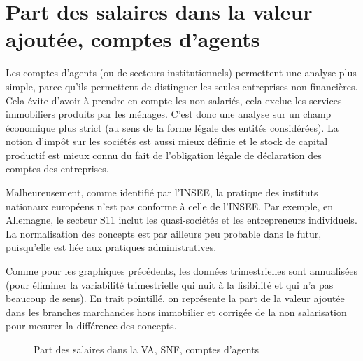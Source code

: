 \documentclass[
  french,
  9pt,
  a4paper,
]{article}
\begin{document}
\section{Part des salaires dans la valeur ajoutée, comptes
d'agents}\label{part-des-salaires-dans-la-valeur-ajoutuxe9e-comptes-dagents}

Les comptes d'agents (ou de secteurs institutionnels) permettent une
analyse plus simple, parce qu'ils permettent de distinguer les seules
entreprises non financières. Cela évite d'avoir à prendre en compte les
non salariés, cela exclue les services immobiliers produits par les
ménages. C'est donc une analyse sur un champ économique plus strict (au
sens de la forme légale des entités considérées). La notion d'impôt sur
les sociétés est aussi mieux définie et le stock de capital productif
est mieux connu du fait de l'obligation légale de déclaration des
comptes des entreprises.

Malheureusement, comme identifié par l'INSEE, la pratique des instituts
nationaux européens n'est pas conforme à celle de l'INSEE. Par exemple,
en Allemagne, le secteur S11 inclut les quasi-sociétés et les
entrepreneurs individuels. La normalisation des concepts est par
ailleurs peu probable dans le futur, puisqu'elle est liée aux pratiques
administratives.

Comme pour les graphiques précédents, les données trimestrielles sont
annualisées (pour éliminer la variabilité trimestrielle qui nuit à la
lisibilité et qui n'a pas beaucoup de sens). En trait pointillé, on
représente la part de la valeur ajoutée dans les branches marchandes
hors immobilier et corrigée de la non salarisation pour mesurer la
différence des concepts.

\begin{figure}[H]

\caption{\label{fig-s11psal}Part des salaires dans la VA, SNF, comptes
d'agents}


\end{figure}%
\end{document}
